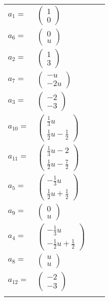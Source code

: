 \documentclass[1p]{elsarticle_modified}
\theoremstyle{definition}
\begin{document}
\begin{tabular}{m{7pt} m{180pt} m{7pt} m{180pt} }
\flushright $a_{1}=$&$\begin{pmatrix}1\\0\end{pmatrix}$ \\
\flushright $a_{6}=$&$\begin{pmatrix}0\\u\end{pmatrix}$ \\
\flushright $a_{2}=$&$\begin{pmatrix}1\\3\end{pmatrix}$ \\
\flushright $a_{7}=$&$\begin{pmatrix}- u\\-2 u\end{pmatrix}$ \\
\flushright $a_{3}=$&$\begin{pmatrix}-2\\-3\end{pmatrix}$ \\
\flushright $a_{10}=$&$\begin{pmatrix}\frac{1}{3} u\\\frac{1}{2} u-\frac{1}{2}\end{pmatrix}$ \\
\flushright $a_{11}=$&$\begin{pmatrix}\frac{1}{3} u-2\\\frac{1}{2} u-\frac{7}{2}\end{pmatrix}$ \\
\flushright $a_{5}=$&$\begin{pmatrix}-\frac{1}{3} u\\\frac{1}{2} u+\frac{1}{2}\end{pmatrix}$ \\
\flushright $a_{9}=$&$\begin{pmatrix}0\\u\end{pmatrix}$ \\
\flushright $a_{4}=$&$\begin{pmatrix}-\frac{1}{3} u\\-\frac{1}{2} u+\frac{1}{2}\end{pmatrix}$ \\
\flushright $a_{8}=$&$\begin{pmatrix}u\\u\end{pmatrix}$ \\
\flushright $a_{12}=$&$\begin{pmatrix}-2\\-3\end{pmatrix}$\\&\end{tabular}
\end{document}
